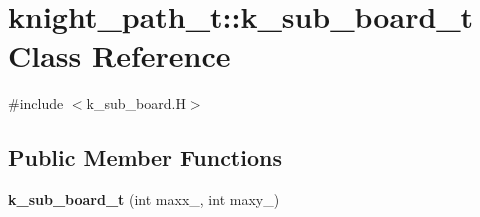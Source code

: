 \hypertarget{classknight__path__t_1_1k__sub__board__t}{\section{knight\-\_\-path\-\_\-t\-:\-:k\-\_\-sub\-\_\-board\-\_\-t \-Class \-Reference}
\label{classknight__path__t_1_1k__sub__board__t}
}


{\ttfamily \#include $<$k\-\_\-sub\-\_\-board.\-H$>$}

\subsection*{\-Public \-Member \-Functions}
\begin{DoxyCompactItemize}
\item 
\hypertarget{classknight__path__t_1_1k__sub__board__t_a0a2e82f99e3e54e6fa6c4b6be97cd351}{{\bfseries k\-\_\-sub\-\_\-board\-\_\-t} (int maxx\-\_\-, int maxy\-\_\-)}\label{classknight__path__t_1_1k__sub__board__t_a0a2e82f99e3e54e6fa6c4b6be97cd351}


\end{DoxyCompactItemize}
